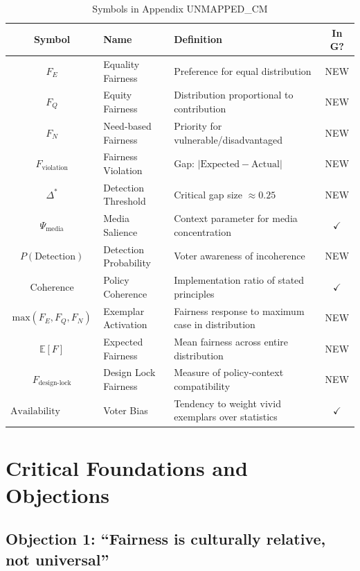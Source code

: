 \begin{table}[htbp]
\centering
\caption{Symbols in Appendix UNMAPPED_CM}
\label{tab:cm-symbols}
\renewcommand{\arraystretch}{1.3}
\begin{tabular}{@{}clp{5cm}c@{}}
\toprule
\textbf{Symbol} & \textbf{Name} & \textbf{Definition} & \textbf{In G?} \\
\midrule
$F_E$ & Equality Fairness & Preference for equal distribution & NEW \\
$F_Q$ & Equity Fairness & Distribution proportional to contribution & NEW \\
$F_N$ & Need-based Fairness & Priority for vulnerable/disadvantaged & NEW \\
$F_{\text{violation}}$ & Fairness Violation & Gap: $|\text{Expected} - \text{Actual}|$ & NEW \\
$\Delta^*$ & Detection Threshold & Critical gap size $\approx 0.25$ & NEW \\
$\Psi_{\text{media}}$ & Media Salience & Context parameter for media concentration & $\checkmark$ \\
$P(\text{Detection})$ & Detection Probability & Voter awareness of incoherence & NEW \\
$\text{Coherence}$ & Policy Coherence & Implementation ratio of stated principles & $\checkmark$ \\
$\text{max}(F_E, F_Q, F_N)$ & Exemplar Activation & Fairness response to maximum case in distribution & NEW \\
$\mathbb{E}[F]$ & Expected Fairness & Mean fairness across entire distribution & NEW \\
$F_{\text{design-lock}}$ & Design Lock Fairness & Measure of policy-context compatibility & NEW \\
$\text{Availability Heuristic}$ & Voter Bias & Tendency to weight vivid exemplars over statistics & $\checkmark$ \\
\bottomrule
\end{tabular}
\end{table}

\section{Critical Foundations and Objections}
\label{sec:cm-foundations}

\subsection{Objection 1: ``Fairness is culturally relative, not universal''}

